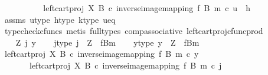 \begin{isabellebody}
\ \ \isanewline
\ \ \ \ \ \ \isamarkupfalse%
\ {\isachardoublequoteopen}{\isacharparenleft}{\kern0pt}left{\isacharunderscore}{\kern0pt}cart{\isacharunderscore}{\kern0pt}proj\ X\ B\ {\isasymcirc}\isactrlsub c\ inverse{\isacharunderscore}{\kern0pt}image{\isacharunderscore}{\kern0pt}mapping\ f\ B\ m{\isacharparenright}{\kern0pt}\ {\isasymcirc}\isactrlsub c\ u\ {\isacharequal}{\kern0pt}\ h{\isachardoublequoteclose}\isanewline
\ \ \ \ \ \ \ \ \isamarkupfalse%
\ assms\ u{\isacharunderscore}{\kern0pt}type\ h{\isacharunderscore}{\kern0pt}type\ k{\isacharunderscore}{\kern0pt}type\ u{\isacharunderscore}{\kern0pt}eq\isanewline
\ \ \ \ \ \ \ \ \isamarkupfalse%
\ {\isacharparenleft}{\kern0pt}typecheck{\isacharunderscore}{\kern0pt}cfuncs{\isacharcomma}{\kern0pt}\ metis\ {\isacharparenleft}{\kern0pt}full{\isacharunderscore}{\kern0pt}types{\isacharparenright}{\kern0pt}\ comp{\isacharunderscore}{\kern0pt}associative{}\ left{\isacharunderscore}{\kern0pt}cart{\isacharunderscore}{\kern0pt}proj{\isacharunderscore}{\kern0pt}cfunc{\isacharunderscore}{\kern0pt}prod{\isacharparenright}{\kern0pt}\isanewline
\ \ \ \ \isamarkupfalse%
\isanewline
\ \ \isamarkupfalse%
\isanewline
{}\isamarkupfalse%
\isanewline
\ \ \isamarkupfalse%
\ Z\ j\ y\isanewline
\ \ \isamarkupfalse%
\ j{\isacharunderscore}{\kern0pt}type{\isacharcolon}{\kern0pt}\ {\isachardoublequoteopen}j\ {\isacharcolon}{\kern0pt}\ Z\ {\isasymrightarrow}\ {\isacharparenleft}{\kern0pt}f\isactrlsup {\isacharminus}{\kern0pt}B{\isasymrparr}\isactrlbsub m\isactrlesub {\isacharparenright}{\kern0pt}{\isachardoublequoteclose}\isanewline
\ \ \isamarkupfalse%
\ y{\isacharunderscore}{\kern0pt}type{\isacharcolon}{\kern0pt}\ {\isachardoublequoteopen}y\ {\isacharcolon}{\kern0pt}\ Z\ {\isasymrightarrow}\ {\isacharparenleft}{\kern0pt}f\isactrlsup {\isacharminus}{\kern0pt}B{\isasymrparr}\isactrlbsub m\isactrlesub {\isacharparenright}{\kern0pt}{\isachardoublequoteclose}\isanewline
\ \ \isamarkupfalse%
\ {\isachardoublequoteopen}{\isacharparenleft}{\kern0pt}left{\isacharunderscore}{\kern0pt}cart{\isacharunderscore}{\kern0pt}proj\ X\ B\ {\isasymcirc}\isactrlsub c\ inverse{\isacharunderscore}{\kern0pt}image{\isacharunderscore}{\kern0pt}mapping\ f\ B\ m{\isacharparenright}{\kern0pt}\ {\isasymcirc}\isactrlsub c\ y\ {\isacharequal}{\kern0pt}\isanewline
\ \ \ \ \ \ \ {\isacharparenleft}{\kern0pt}left{\isacharunderscore}{\kern0pt}cart{\isacharunderscore}{\kern0pt}proj\ X\ B\ {\isasymcirc}\isactrlsub c\ inverse{\isacharunderscore}{\kern0pt}image{\isacharunderscore}{\kern0pt}mapping\ f\ B\ m{\isacharparenright}{\kern0pt}\ {\isasymcirc}\isactrlsub c\ j{\isachardoublequoteclose}\isanewline

\end{isabellebody}
